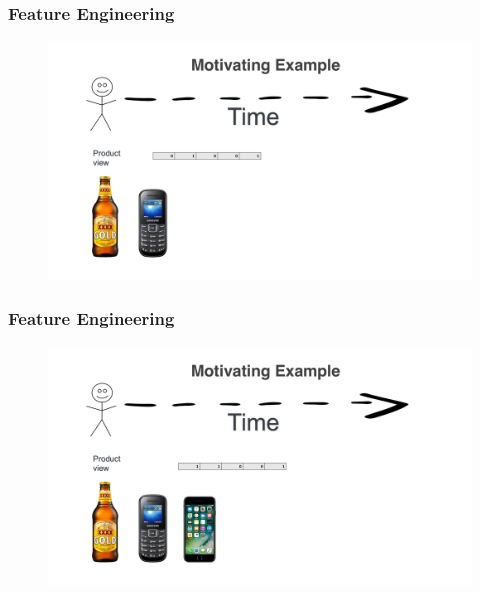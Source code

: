  \begin{frame}
  \frametitle{Feature Engineering}
 
 
   \begin{figure}[h!]
     \includegraphics[scale=0.25]{images/feat_eng2.png}
       \centering
       \label{motex1}
   \end{figure}
     
 \end{frame}

 \begin{frame}
  \frametitle{Feature Engineering}
 
 
   \begin{figure}[h!]
     \includegraphics[scale=0.25]{images/feat_eng3.png}
       \centering
       \label{motex1}
   \end{figure}
     
 \end{frame}

